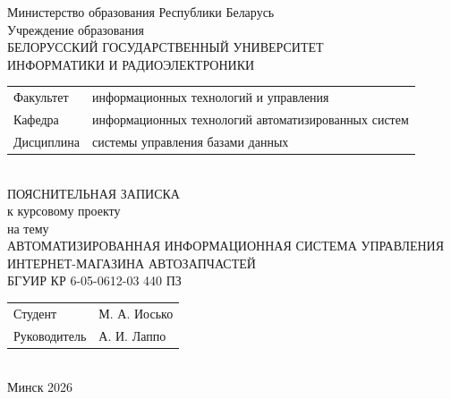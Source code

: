 \begin{titlepage}
  \begin{center}
    Министерство образования Республики Беларусь\\[1em]
    Учреждение образования\\
    БЕЛОРУССКИЙ ГОСУДАРСТВЕННЫЙ УНИВЕРСИТЕТ \\
    ИНФОРМАТИКИ И РАДИОЭЛЕКТРОНИКИ\\[1em]

    \begin{minipage}{\textwidth}
      \begin{flushleft}
        \begin{tabular}{ l l }
          Факультет & информационных технологий и управления\\
          Кафедра & информационных технологий автоматизированных систем\\
          Дисциплина & системы управления базами данных
        \end{tabular}
      \end{flushleft}
    \end{minipage}\\[1em]

    \vfill
    {ПОЯСНИТЕЛЬНАЯ ЗАПИСКА}\\
    {к курсовому проекту}\\
    {на тему}\\[1em]
    \MakeUppercase{Автоматизированная информационная система управления интернет-магазина автозапчастей}\\[1em]
    {БГУИР  КР 6-05-0612-03 440 ПЗ}\\
        \vfill
    \begin{tabular}{ p{}p{} }
      Студент & М. А. Иосько \\
      Руководитель & А. И. Лаппо \\
    \end{tabular}
    \textbf{\large \MakeUppercase {}}\\[5em]
    {\normalsize Минск 2026}
  \end{center}
\end{titlepage}
